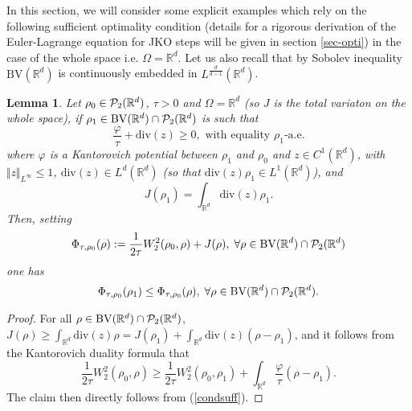 \documentclass[12pt, a4paper]{article}
\numberwithin{equation}{section}
\theoremstyle{plain}
\newtheorem{lem}[thm]{Lemma}
\theoremstyle{definition}
\theoremstyle{remark}
\newcommand\PP{{\cal P}}
\newcommand{\R}{\mathbb{R}}
\newcommand{\BV}{\mathrm{BV}}
\newcommand{\dive}{\mathrm{div}}
\newcommand\pref[1]{(\ref{#1})}
\begin{document}
\smallskip

In this section, we will consider some explicit examples which rely on the following sufficient optimality condition (details for a rigorous derivation of the Euler-Lagrange equation for JKO steps will be given  in section \ref{sec-opti}) in the case of the whole space i.e. $\Omega=\R^d$. Let us also recall that by Sobolev inequality $\BV(\R^d)$ is continuously embedded in $L^{\frac{d}{d-1}}(\R^d)$. 


\begin{lem}\label{1dsufficient}
Let $\rho_0 \in \PP_2(\R^d)$, $\tau>0$ and $\Omega=\R^d$ (so $J$ is the total variaton on the whole space), if $\rho_1\in \BV(\R^d)\cap \PP_2(\R^d)$ is such that 
\begin{equation}\label{condsuff}
\frac{\varphi}{\tau} + \dive(z)\ge 0, \mbox{ with equality $\rho_1$-a.e.} 
\end{equation}
where $\varphi$ is a Kantorovich potential between $\rho_1$ and $\rho_0$ and $z\in C^1(\R^d)$, with  $\Vert z \Vert_{L^\infty} \le 1$, $\dive(z)\in L^d(\R^d)$ (so that $\dive(z) \rho_1\in L^1(\R^d)$), and 
\begin{equation}\label{zsubdiff}
J(\rho_1)=\int_{\R^d} \dive(z) \rho_1.
\end{equation}
Then, setting 
\begin{equation}\label{defPhi}
\Phi_{\tau, \rho_0}(\rho):=\frac{1}{2\tau} W_2^2(\rho_0, \rho)+J(\rho), \; \forall \rho \in \BV(\R^d)\cap \PP_2(\R^d)
\end{equation}
one has 
\[\Phi_{\tau, \rho_0}(\rho_1) \le \Phi_{\tau, \rho_0}(\rho), \; \forall \rho \in \BV(\R^d)\cap \PP_2(\R^d).\]
\end{lem}

\begin{proof}
For all $\rho\in \BV(\R^d)\cap \PP_2(\R^d)$, $J(\rho)\ge \int_{\R^d} \dive(z) \rho=J(\rho_1)+\int_{\R^d} \dive(z) (\rho-\rho_1)$, and it follows from  the Kantorovich duality formula that
\[\frac{1}{2\tau} W_2^2(\rho_0, \rho)\ge \frac{1}{2\tau} W_2^2(\rho_0, \rho_1) +\int_{\R^d} \frac{\varphi}{\tau} (\rho-\rho_1).\]
The claim then directly follows from \pref{condsuff}. 
\end{proof}



\end{document}
